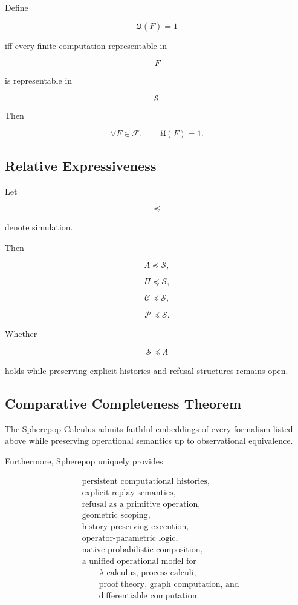 \documentclass[12pt,oneside]{article}
\theoremstyle{definition}
\theoremstyle{remark}
\begin{document}
Define

\[
\mathfrak U(F)
=
1
\]

iff every finite computation representable in

\[
F
\]

is representable in

\[
\mathcal S.
\]

Then

\[
\forall
F
\in
\mathcal F,
\qquad
\mathfrak U(F)=1.
\]

\subsection*{Relative Expressiveness}

Let

\[
\preceq
\]

denote simulation.

Then

\[
\Lambda
\preceq
\mathcal S,
\]

\[
\Pi
\preceq
\mathcal S,
\]

\[
\mathcal C
\preceq
\mathcal S,
\]

\[
\mathcal P
\preceq
\mathcal S.
\]

Whether

\[
\mathcal S
\preceq
\Lambda
\]

holds while preserving explicit histories and refusal structures remains open.

\subsection*{Comparative Completeness Theorem}

The Spherepop Calculus admits faithful embeddings of every formalism listed above while preserving operational semantics up to observational equivalence.

Furthermore, Spherepop uniquely provides

\[
\boxed{
\begin{aligned}
&
\text{persistent computational histories},\\
&
\text{explicit replay semantics},\\
&
\text{refusal as a primitive operation},\\
&
\text{geometric scoping},\\
&
\text{history-preserving execution},\\
&
\text{operator-parametric logic},\\
&
\text{native probabilistic composition},\\
&
\text{a unified operational model for}\\
&
\qquad
\lambda\text{-calculus, process calculi,}\\
&
\qquad
\text{proof theory, graph computation, and}\\
&
\qquad
\text{differentiable computation.}
\end{aligned}
}
\]
\end{document}
